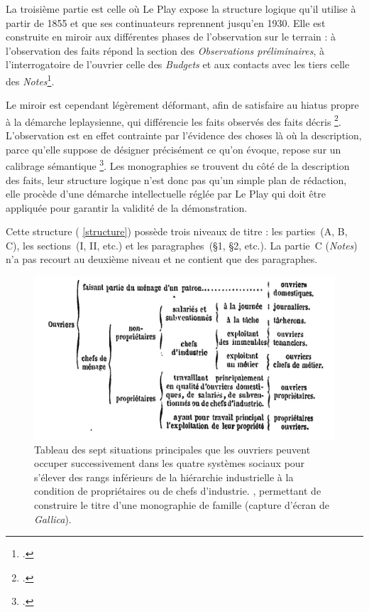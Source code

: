 La troisième partie est celle où Le Play expose la structure logique qu'il utilise à partir de 1855 et que ses continuateurs reprennent jusqu'en 1930.
Elle est construite en miroir aux différentes phases de l'observation sur le terrain : à l'observation des faits répond la section des\textit{ Observations préliminaires}, à l'interrogatoire de l'ouvrier celle des \textit{Budgets} et aux contacts avec les tiers celle des \textit{Notes}\footcite[III., \og Précis des faits à observer --- Établissement des budgets \fg{}, p. 20-31]{instruction62}.

Le miroir est cependant légèrement déformant, afin de satisfaire au \og hiatus \fg{} propre à la démarche leplaysienne, qui différencie les \og faits observés \fg{} des \og faits décris \fg\footcite[p. 87]{baciocchi2}. L'observation est en effet \og contrainte par l'évidence des choses \fg{} là où la description, \og parce qu'elle suppose de désigner précisément ce qu'on évoque, repose sur un calibrage sémantique \fg{}\footcite[p. 87-88]{baciocchi2}. Les monographies se trouvent du côté de la description des faits, leur structure logique n'est donc pas qu'un simple plan de rédaction, elle procède d'une démarche intellectuelle réglée par Le Play qui doit être appliquée pour garantir la validité de la démonstration.

Cette structure (\ann{} \ref{structure}) possède trois niveaux de titre : les parties~(A, B, C), les sections~(I, II, etc.) et les paragraphes~(§1, §2, etc.). La partie~C (\textit{Notes}) n'a pas recourt au deuxième niveau et ne contient que des paragraphes.

\begin{figure}[h]
    \centering
    \includegraphics{img/tabl_titres.jpg}
    \caption[Tableau des sept situations principales que les ouvriers peuvent occuper successivement]{\og Tableau des sept situations principales que les ouvriers peuvent occuper successivement dans les quatre systèmes sociaux pour s'élever des rangs inférieurs de la hiérarchie industrielle à la condition de propriétaires ou de chefs d'industrie. \fg{}, permettant de construire le titre d'une monographie de famille (capture d'écran de \textit{Gallica}).}
    \label{tabletitre}
\end{figure}


